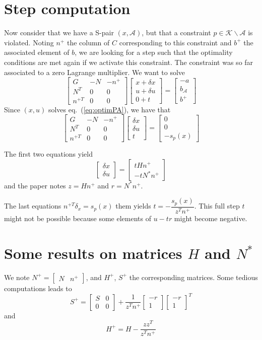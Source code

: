 \documentclass[11pt,a4paper]{article}
\newcommand{\BIN}{\begin{bmatrix}}
\newcommand{\BOUT}{\end{bmatrix}}
\newcommand{\eq}[1]{eq.~(\ref{eq:#1})}
\newcommand{\act}{\mathcal{A}}
\begin{document}
\section{Step computation}
Now consider that we have a S-pair $(x,\act)$, but that a constraint $p \in \mathcal{K} \backslash \act$ is violated. Noting $n^+$ the column of $C$ corresponding to this constraint and $b^+$ the associated element of $b$, we are looking for a step such that the optimality conditions are met again if we activate this constraint. The constraint was so far associated to a zero Lagrange multiplier. We want to solve
\begin{equation}
	\BIN G & -N & -n^+ \\ N^T & 0 & 0 \\ n^{+T} & 0 & 0\BOUT \BIN x + \delta x \\ u + \delta u \\ 0 + t\BOUT = \BIN -a \\ b_\act \\ b^+\BOUT
\end{equation}
Since $(x,u)$ solves \eq{optimPA}, we have that
\begin{equation}
	\BIN G & -N & -n^+ \\ N^T & 0 & 0 \\ n^{+T} & 0 & 0\BOUT \BIN \delta x \\ \delta u \\ t\BOUT = \BIN 0 \\ 0 \\ - s_p(x)\BOUT
\end{equation}

The first two equations yield
\begin{equation}
	\BIN \delta x \\ \delta u \BOUT = \BIN t H n^+ \\ -t N^* n^+ \BOUT 
\end{equation}
and the paper notes $z = H n^+$ and $r = N^* n^+$.

The last equations $ n^{+T} \delta_x = s_p(x)$ them yields $t = -\dfrac{s_p(x)}{z^Tn^+}$. This full step $t$ might not be possible because some elements of $u - tr$ might become negative.

\section{Some results on matrices $H$ and $N^*$}
We note $N^+ = \BIN N & n^+\BOUT$, and $H^+$, $S^+$ the corresponding matrices.
Some tedious computations leads to
\begin{equation}
	S^+ = \BIN S & 0 \\ 0 & 0 \BOUT + \frac{1}{z^T n^+} \BIN -r \\ 1\BOUT \BIN -r \\ 1\BOUT^T
\end{equation}
and 
\begin{equation}
	H^+ = H - \frac{z z^T}{z^T n^+}
\end{equation}



\end{document}
